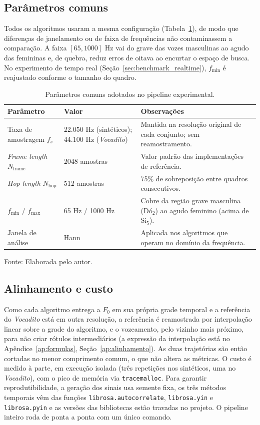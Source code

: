 \subsection{Parâmetros comuns}
 Todos os algoritmos usaram a mesma configuração (Tabela~\ref{tab:parametros_pipeline}), de modo que diferenças de janelamento ou de faixa de frequências não contaminassem a comparação. A faixa $[65, 1000]$ Hz vai do grave das vozes masculinas ao agudo das femininas \cite{aalto_speech_properties} e, de quebra, reduz erros de oitava ao encurtar o espaço de busca. No experimento de tempo real (Seção~\ref{sec:benchmark_realtime}), $f_{\text{min}}$ é reajustado conforme o tamanho do quadro.

\begin{table}[H]
\centering
\caption{\label{tab:parametros_pipeline}Parâmetros comuns adotados no pipeline experimental.}
\small
\begin{tabular}{|p{4.0cm}|p{3.5cm}|p{7.0cm}|}
\hline
\textbf{Parâmetro} & \textbf{Valor} & \textbf{Observações} \\
\hline
Taxa de amostragem $f_s$ &
22{.}050 Hz (sintéticos); 44{.}100 Hz (\textit{Vocadito}) &
Mantida na resolução original de cada conjunto; sem reamostramento. \\
\hline
\textit{Frame length} $N_{\text{frame}}$ & 2048 amostras &
Valor padrão das implementações de referência. \\
\hline
\textit{Hop length} $N_{\text{hop}}$ & 512 amostras &
75\% de sobreposição entre quadros consecutivos. \\
\hline
$f_{\text{min}}$ / $f_{\text{max}}$ & 65 Hz / 1000 Hz &
Cobre da região grave masculina (Dó$_2$) ao agudo feminino (acima de Si$_5$). \\
\hline
Janela de análise & Hann &
Aplicada nos algoritmos que operam no domínio da frequência. \\
\hline
\end{tabular}
\small Fonte: Elaborada pelo autor.
\end{table}

\subsection{Alinhamento e custo}
Como cada algoritmo entrega a $F_0$ em sua própria grade temporal e a referência do \textit{Vocadito} está em outra resolução, a referência é reamostrada por interpolação linear sobre a grade do algoritmo, e o vozeamento, pelo vizinho mais próximo, para não criar rótulos intermediários (a expressão da interpolação está no Apêndice~\ref{ap:formulas}, Seção~\ref{ap:alinhamento}). As duas trajetórias são então cortadas no menor comprimento comum, o que não altera as métricas. O custo é medido à parte, em execução isolada (três repetições nos sintéticos, uma no \textit{Vocadito}), com o pico de memória via \texttt{tracemalloc}. Para garantir reprodutibilidade, a geração dos sinais usa semente fixa, os três métodos temporais vêm das funções \texttt{librosa.autocorrelate}, \texttt{librosa.yin} e \texttt{librosa.pyin} \cite{librosa_autocorrelate_docs,librosa_yin_docs,librosa_pyin_docs} e as versões das bibliotecas estão travadas no projeto. O pipeline inteiro roda de ponta a ponta com um único comando.

